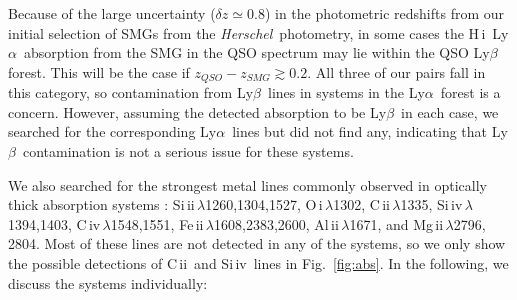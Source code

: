 \documentclass[iop,revtex4,twocolumn,apj,numberedappendix,appendixfloats]{emulateapj}
\newcommand{\hers}{{\it Herschel}}
\newcommand{\lya}{Ly$\alpha$}
\newcommand{\lyb}{Ly$\beta$}
\newcommand{\HI}{H\,{\sc i}}
\newcommand{\CII}{C\,{\sc ii}}
\newcommand{\SiIV}{Si\,{\sc iv}}
\begin{document}
Because of the large uncertainty ($\delta z \simeq 0.8$) in the photometric redshifts from our initial selection of SMGs from the \hers\ photometry, in some cases the \HI\ \lya\ absorption from the SMG in the QSO spectrum may lie within the QSO Ly$\beta$ forest. This will be the case if $z_{QSO} - z_{SMG} \gtrsim 0.2$.
All three of our pairs fall in this category, so contamination from \lyb\ lines in systems in the \lya\ forest is a concern. However, assuming the detected absorption to be \lyb\ in each case, we searched for the corresponding \lya\ lines but did not find any, indicating that \lyb\ contamination is not a serious issue for these systems.

We also searched for the strongest metal lines commonly observed in optically thick absorption systems \citep[e.g.,][]{Hennawi13}: Si\,{\sc ii}\,$\lambda$1260,1304,1527, O\,{\sc i}\,$\lambda$1302, \CII\,$\lambda$1335, Si\,{\sc iv}\,$\lambda$1394,1403, C\,{\sc iv}\,$\lambda$1548,1551, Fe\,{\sc ii}\,$\lambda$1608,2383,2600, Al\,{\sc ii}\,$\lambda$1671, and Mg\,{\sc ii}\,$\lambda$2796, 2804. Most of these lines are not detected in any of the systems, so we only show the possible detections of \CII\ and \SiIV\ lines in Fig.~\ref{fig:abs}. In the following, we discuss the systems individually:
\end{document}
